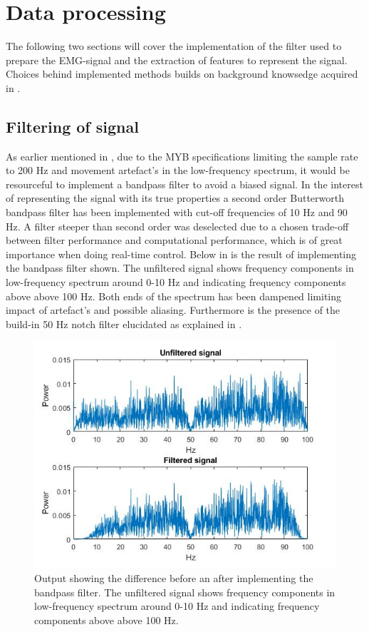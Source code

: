 

\section{Data processing}

The following two sections will cover the implementation of the filter used to prepare the EMG-signal and the extraction of features to represent the signal. Choices behind implemented methods builds on background knowsedge acquired in . 


\subsection{Filtering of signal} \label{sec:prePros} 

As earlier mentioned in , due to the MYB specifications limiting the sample rate to 200 Hz and movement artefact's in the low-frequency spectrum, it would be resourceful to implement a bandpass filter to avoid a biased signal.
In the interest of representing the signal with its true properties a second order Butterworth bandpass filter has been implemented with cut-off frequencies of 10 Hz and 90 Hz. A filter steeper than second order was deselected due to a chosen trade-off between filter performance and computational performance, which is of great importance when doing real-time control. Below in  is the result of implementing the bandpass filter shown. The unfiltered signal shows frequency components in low-frequency spectrum around 0-10 Hz and indicating frequency components above above 100 Hz. Both ends of the spectrum has been dampened limiting impact of artefact's and possible aliasing. Furthermore is the presence of the build-in 50 Hz notch filter elucidated as explained in .     


\begin{figure}[H]                 
	\includegraphics[width=.8\textwidth]{figures/pMethods/Filt}  
	\caption{Output showing the difference before an after implementing the bandpass filter. The unfiltered signal shows frequency components in low-frequency spectrum around 0-10 Hz and indicating frequency components above above 100 Hz.}
	\label{fig:filt} 
\end{figure}





